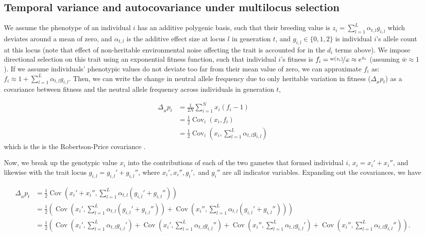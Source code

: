 \documentclass[11pt]{article}
\DeclareMathOperator{\cov}{Cov}
\begin{document}
\subsection{Temporal variance and autocovariance under multilocus selection}
\label{ap:multilocus}

We assume the phenotype of an individual $i$ has an additive polygenic basis,
such that their breeding value is $z_i = \sum_{l=1}^L \alpha_{t,l} g_{i,l}$
which deviates around a mean of zero, and $\alpha_{t,l}$ is the additive effect
size at locus $l$ in generation $t$, and $g_{i,l} \in \{0,1,2\}$ is individual
$i$'s allele count at this locus (note that effect of non-heritable
environmental noise affecting the trait is accounted for in the $d_i$ terms
above). We impose directional selection on this trait using an exponential
fitness function, such that individual $i$'s fitness is $f_i =
\nicefrac{w(z_i)}{\bar{w}} \approx e^{z_i}$ (assuming $\bar{w} \approx 1$). If
we assume individuals' phenotypic values do not deviate too far from their mean
value of zero, we can approximate $f_i$ as: $f_i \approx 1 + \sum_{l=1}^L
\alpha_{t,l} g_{i,l}$. Then, we can write the change in neutral allele
frequency due to only heritable variation in fitness ($\Delta_{_H} p_t$) as a
covariance between fitness and the neutral allele frequency across individuals
in generation $t$, 

\begin{align}
  \Delta_{_H} p_t &= \frac{1}{2N} \sum_{i=1}^N x_i \left(f_i - 1\right) \\
                  &= \frac{1}{2} \cov_i(x_i, f_i) \\
                  &= \frac{1}{2} \cov_i(x_i, \sum_{l=1}^L \alpha_{t,l} g_{i,l})
\end{align}
%
which is the is the Robertson-Price covariance
\parencite{Price1970-si,Robertson1966-fs,Lynch1998-wl,Walsh2018-bt}.

Now, we break up the genotypic value $x_i$ into the contributions of each of
the two gametes that formed individual $i$, $x_i = x_i' + x_i''$, and likewise
with the trait locus $g_{i,l} = g_{i,l}' + g_{i,l}''$, where $x_i', x_i'',
g_i',$ and $g_i''$ are all indicator variables. Expanding out the covariances, we have

\begin{align}
  \Delta_{_H} p_t &= \frac{1}{2}\cov(x_i' + x_i'', \sum_{l=1}^L \alpha_{t,l} (g_{i,l}' + g_{i,l}'')) \nonumber \\
                &= \frac{1}{2}\left(\cov(x_i', \sum_{l=1}^L \alpha_{t,l} (g_{i,l}' + g_{i,l}'')) + \cov(x_i'', \sum_{l=1}^L \alpha_{t,l} (g_{i,l}' + g_{i,l}'')) \right) \nonumber \\ 
                &= \frac{1}{2} \left( \cov(x_i', \sum_{l=1}^L \alpha_{t,l} g_{i,l}') + \cov(x_i', \sum_{l=1}^L \alpha_{t,l} g_{i,l}'') + \cov(x_i'', \sum_{l=1}^L \alpha_{t,l} g_{i,l}') + \cov(x_i'', \sum_{l=1}^L \alpha_{t,l} g_{i,l}'') \right).
\end{align}
\end{document}
